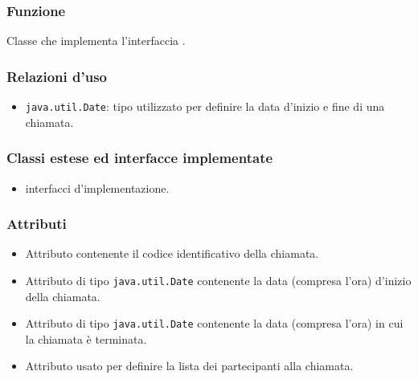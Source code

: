 
\subsubsection*{Funzione}
Classe che implementa l'interfaccia .

\subsubsection*{Relazioni d'uso}
\begin{itemize}
	\item \texttt{java.util.Date}: tipo utilizzato per definire la data d'inizio e fine di una chiamata.
\end{itemize}

\subsubsection*{Classi estese ed interfacce implementate}
\begin{itemize}
	\item {} interfacci d'implementazione.
\end{itemize}

\subsubsection*{Attributi}

\begin{itemize}
	\item{}
	Attributo contenente il codice identificativo della chiamata.
	\item{}
	Attributo di tipo \texttt{java.util.Date} contenente la data (compresa l'ora) d'inizio della chiamata.
	\item{}
	Attributo di tipo \texttt{java.util.Date} contenente la data (compresa l'ora) in cui la chiamata è terminata.
	\item{}
	Attributo usato per definire la lista dei partecipanti alla chiamata.
\end{itemize}

